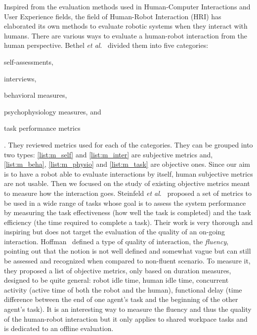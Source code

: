 \documentclass[a4paper,11pt,twoside]{StyleThese}
\begin{document}
Inspired from the evaluation methods used in Human-Computer Interactions and User Experience fields, the field of Human-Robot Interaction (HRI) has elaborated its own methods to evaluate robotic systems when they interact with humans. There are various ways to evaluate a human-robot interaction from the human perspective. Bethel \textit{et al}.~\cite{bethel_2010_review} divided them into five categories: \begin{inlineEnumerate}
	\item self-assessments,\label{list:m_self}
	\item interviews,\label{list:m_inter}
	\item behavioral measures,\label{list:m_beha}
	\item psychophysiology measures, and\label{list:m_physio}
	\item task performance metrics\label{list:m_task}
\end{inlineEnumerate}. They reviewed metrics used for each of the categories. They can be grouped into two types: \ref{list:m_self} and \ref{list:m_inter} are subjective metrics and, \ref{list:m_beha}, \ref{list:m_physio} and \ref{list:m_task} are objective ones. Since our aim is to have a robot able to evaluate interactions by itself, human subjective metrics are not usable. Then we focused on the study of existing objective metrics meant to measure how the interaction goes. Steinfeld \textit{et al}.~\cite{steinfeld_2006_common} proposed a set of metrics to be used in a wide range of tasks whose goal is to assess the system performance by measuring the task effectiveness (\ie how well the task is completed) and the task efficiency (\ie the time required to complete a task). Their work is very thorough and inspiring but does not target the evaluation of the quality of an on-going interaction. 
Hoffman~\cite{hoffman2019} defined a type of quality of interaction, the \textit{fluency}, pointing out that the notion is not well defined and somewhat vague but can still be assessed and recognized when compared to non-fluent scenario. To measure it, they proposed a list of objective metrics, only based on duration measures, designed to be quite general: robot idle time, human idle time, concurrent activity (\ie active time of both the robot and the human), functional delay (\ie time difference between the end of one agent’s task and the beginning of the other agent’s task). It is an interesting way to measure the fluency and thus the quality of the human-robot interaction but it only applies to shared workpace tasks and is dedicated to an offline evaluation.
\end{document}
